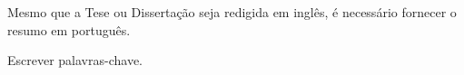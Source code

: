 \resumo

Mesmo que a Tese ou Dissertação seja redigida em inglês, é necessário fornecer o resumo em português.\\

\begin{keywords}
Escrever palavras-chave.
\end{keywords}